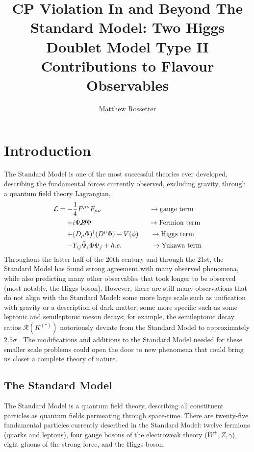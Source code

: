 \documentclass[a4paper,12pt]{article}
\title{CP Violation In and Beyond The Standard Model: Two Higgs Doublet Model Type II Contributions to Flavour Observables}
\author{Matthew Rossetter}
\affiliation{Supervised By Alexander Lenz}
\affiliation{MPhys Theoretical Physics, Durham University}
\begin{document}
 
\maketitle

\section{Introduction}
The Standard Model is one of the most successful theories ever developed, describing the fundamental forces currently observed, excluding gravity, through a quantum field theory Lagrangian, 
\begin{equation}
    \label{eq:sm}
    \begin{split}
        \mathcal{L} = -&\frac14 F^{\mu\nu}F_{\mu\nu} \qquad\qquad\qquad\quad\to \text{gauge term}\\
                      +& i\bar{\Psi}\cancel{D}\Psi \qquad\qquad\qquad\qquad\;\to \text{Fermion term} \\
                      +& (D_\mu\Phi)^\dagger(D^\mu\Phi) - V(\phi) \quad\;\;\,\to \text{Higgs term}\\
                      -& Y_{ij}\bar{\Psi}_i\Phi\Psi_j + h.c. \qquad\qquad\;\to\text{Yukawa term}
    \end{split}
\end{equation}
Throughout the latter half of the 20th century and through the 21st, the Standard Model has found strong agreement with many observed phenomena, while also predicting many other observables that took longer to be observed (most notably, the Higgs boson).
However, there are still many observations that do not align with the Standard Model: some more large scale such as unification with gravity or a description of dark matter, some more specific such as some leptonic and semileptonic meson decays; for example, the semileptonic decay ratios $\mathcal{R}(K^{(*)})$ notoriously deviate from the Standard Model to approximately $2.5\sigma$ \cite{pdg}.
The modifications and additions to the Standard Model needed for these smaller scale problems could open the door to new phenomena that could bring us closer a complete theory of nature. 

\subsection{The Standard Model}
The Standard Model is a quantum field theory, describing all constituent particles as quantum fields permeating through space-time. 
There are twenty-five fundamental particles currently described in the Standard Model: twelve fermions (quarks and leptons), four gauge bosons of the electroweak theory ($W^\pm,Z,\gamma$), eight gluons of the strong force, and the Higgs boson.
\end{document}
